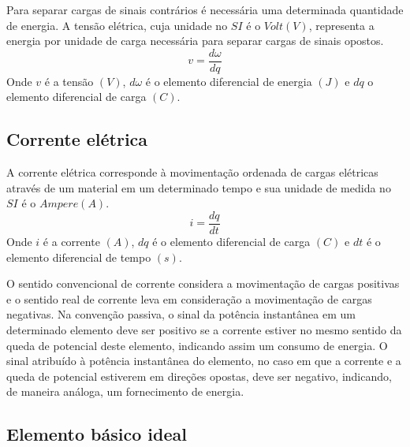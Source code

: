 \documentclass[12pt,fleqn]{book} %
\begin{document}
	            \begin{definition}
	         Para separar cargas de sinais contrários é necessária uma determinada quantidade de energia. A tensão elétrica, cuja unidade no $SI$ é o $Volt (V)$, representa a energia por unidade de carga necessária para separar cargas de sinais opostos.
	         \begin{equation}
	         v = \frac{d\omega}{dq} 
	         \end{equation}
	         Onde $v$ é a tensão $(V)$, $d\omega$ é o elemento diferencial de energia $(J)$ e $dq$ o elemento diferencial de carga $(C)$.
	         \end{definition}
	         
	         \subsection{Corrente elétrica}
	             
	             \begin{definition}
	         A corrente elétrica corresponde à movimentação ordenada de cargas elétricas através de um material em um determinado tempo e sua unidade de medida no $SI$ é o $Ampere (A)$.
	\begin{equation}
	i = \frac{dq}{dt}
	\end{equation}
	         Onde $i$ é a corrente $(A)$, $dq$ é o elemento diferencial de carga $(C)$ e $dt$ é o elemento diferencial de tempo $(s)$. 
	         
	         O sentido convencional de corrente considera a movimentação de cargas positivas e o sentido real de corrente leva em consideração a movimentação de cargas negativas.
	         Na convenção passiva, o sinal da potência instantânea em um determinado elemento deve ser positivo se a corrente estiver no mesmo sentido da queda de potencial deste elemento, indicando assim um consumo de energia. O sinal atribuído à potência instantânea do elemento, no caso em que a corrente e a queda de potencial estiverem em direções opostas, deve ser negativo, indicando, de maneira análoga, um fornecimento de energia. 
	         
	             \end{definition}
	         
	         \subsection{Elemento básico ideal}
	            
\end{document}
